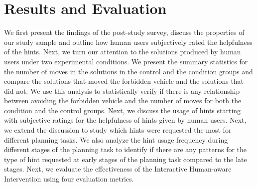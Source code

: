 \section{Results and Evaluation}
We first present the findings of the post-study survey, discuss the properties of our study sample and outline how human users subjectively rated the helpfulness of the hints.
Next, we turn our attention to the solutions produced by human users under two experimental conditions.
We present the summary statistics for the number of moves in the solutions in the control and the condition groups and compare the solutions that moved the forbidden vehicle and the solutions that did not.
We use this analysis to statistically verify if there is any relationship between avoiding the forbidden vehicle and the number of moves for both the condition and the control groups.
Next, we discuss the usage of hints starting with subjective ratings for the helpfulness of hints given by human users.
Next, we extend the discussion to study which hints were requested the most for different planning tasks.
We also analyze the hint usage frequency during different stages of the planning task to identify if there are any patterns for the type of hint requested at early stages of the planning task compared to the late stages.
Next, we evaluate the effectiveness of the Interactive Human-aware Intervention using four evaluation metrics.



